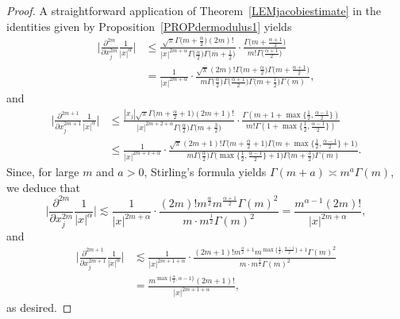 \documentclass[reqno,11pt]{amsart}
\theoremstyle{definition}
\begin{document}
\begin{proof}
	A straightforward application of Theorem~\ref{LEMjacobiestimate} in the identities given by Proposition~\ref{PROPdermodulus1} yields
	\begin{align*}
		\bigg|\frac{\partial^{2m}}{\partial x_j^{2m}}\frac{1}{|x|^{\alpha}}\bigg| &\leq \frac{ \sqrt{\pi} \Gamma\big( m+\frac{\alpha}{2}\big) (2m)! }{|x|^{2m+\alpha}\Gamma\big(\frac{\alpha}{2}\big)\Gamma\big( m+\frac{1}{2}\big)}\cdot \frac{\Gamma\big(m+ \frac{\alpha+1}{2}\big)}{m!\Gamma\big(\frac{\alpha+1}{2}\big)}  \\
		&= \frac{1}{|x|^{2m+\alpha}} \cdot \frac{\sqrt{\pi} (2m)!\Gamma\big( m+\frac{\alpha}{2}\big)  \Gamma\big(m+\frac{\alpha+1}{2}\big) }{m\Gamma\big(\frac{\alpha}{2}\big)\Gamma\big( \frac{\alpha+1}{2}\big)\Gamma\big( m+\frac{1}{2}\big)\Gamma(m)},
	\end{align*}
	and
	\begin{align*}
		\bigg| \frac{\partial^{2m+1}}{\partial x_j^{2m+1}}\frac{1}{|x|^{\alpha}} \bigg|&\leq \frac{|x_j| \sqrt{\pi} \Gamma\big(m+\frac{\alpha}{2}+1\big) (2m+1)!}{|x|^{2m+2+\alpha} \Gamma\big(\frac{\alpha}{2}\big)\Gamma\big(m+\frac{3}{2}\big) }\cdot \frac{\Gamma(m+1+\max\{\frac{1}{2},\frac{\alpha-1}{2}\})}{m!\Gamma(1+\max\{\frac{1}{2},\frac{\alpha-1}{2}\})} \\
		&\leq \frac{1}{|x|^{2m+1+\alpha}}\cdot \frac{\sqrt{\pi}(2m+1)! \Gamma\big(m+\frac{\alpha}{2}+1 \big)  \Gamma\big(m+\max\{\frac{1}{2},\frac{\alpha-1}{2}\}+1\big)}{m\Gamma\big( \frac{\alpha}{2}\big)\Gamma\big(\max\{\frac{1}{2},\frac{\alpha-1}{2}\}+1 \big)\Gamma\big(m+\frac{3}{2} \big)\Gamma(m)}.
	\end{align*}
Since, for large $m$ and $a>0$, Stirling's formula yields $\Gamma(m+a)\asymp m^a\Gamma(m)$,
we deduce that
	\[
	\bigg|\frac{\partial^{2m}}{\partial x_j^{2m}}\frac{1}{|x|^{\alpha}}\bigg|\lesssim \frac{1}{|x|^{2m+\alpha}} \cdot \frac{(2m)! m^{\frac{\alpha}{2}} m^{\frac{\alpha+1}{2}} \Gamma(m)^2}{m\cdot m^{\frac{1}{2}}\Gamma(m)^2} = \frac{m^{\alpha-1} (2m)!}{|x|^{2m+\alpha}},
	\]
	and
	\begin{align*}
		\bigg| \frac{\partial^{2m+1}}{\partial x_j^{2m+1}}\frac{1}{|x|^{\alpha}} \bigg|&\lesssim \frac{1}{|x|^{2m+1+\alpha}}\cdot \frac{(2m+1)! m^{\frac{\alpha}{2}+1} m^{\max\{\frac{1}{2},\frac{\alpha-1}{2}\}+1} \Gamma(m)^2}{m \cdot m^\frac{3}{2}\Gamma(m)^2}
		\\
		& = \frac{m^{\max\{\frac{\alpha}{2},\alpha-1\}}(2m+1)!}{|x|^{2m+1+\alpha}},
	\end{align*}
	as desired.
\end{proof}
\end{document}
